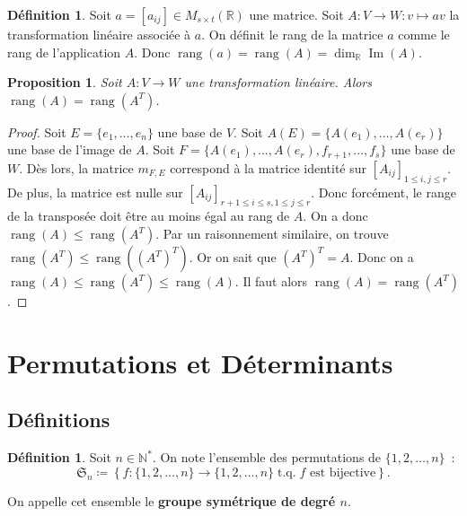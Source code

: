 \documentclass{article}
\DeclareMathOperator{\tq}{\text{ t.q. }}
\DeclareMathOperator{\Imf}{Im}
\DeclareMathOperator{\rang}{rang}
\newcommand{\R}{\mathbb R}
\newcommand{\M}[3]{M_{#1 \times #2}(#3)}
\newtheorem{prp}[thm]{Proposition}
\theoremstyle{definition}
\newtheorem{déf}[thm]{Définition}
\theoremstyle{remark}
\begin{document}
		\begin{déf} Soit $a = [a_{ij}] \in \M st\R$ une matrice. Soit $A : V \to W : v \mapsto av$ la transformation linéaire associée à $a$. On définit le rang de
		la matrice $a$ comme le rang de l'application $A$. Donc $\rang(a) = \rang(A) = \dim_\R\Imf(A)$. \end{déf}

		\begin{prp} Soit $A : V \to W$ une transformation linéaire. Alors $\rang(A) = \rang(A^T)$. \end{prp}

		\begin{proof} Soit $E = \{e_1, \dotsc, e_n\}$ une base de $V$. Soit $A(E) = \{A(e_1), \dotsc, A(e_r)\}$ une base de l'image de $A$. Soit
		$F = \{A(e_1), \dotsc, A(e_r), f_{r+1}, \dotsc, f_s\}$ une base de $W$. Dès lors, la matrice $m_{F, E}$ correspond à la matrice identité sur
		$[A_{ij}]_{1 \leq i, j \leq r}$. De plus, la matrice est nulle sur $[A_{ij}]_{r+1 \leq i \leq s, 1 \leq j \leq r}$. Donc forcément, le range de la transposée
		doit être au moins égal au rang de $A$. On a donc $\rang(A) \leq \rang(A^T)$. Par un raisonnement similaire, on trouve
		$\rang(A^T) \leq \rang\left(\left(A^T\right)^T\right)$. Or on sait que $\left(A^T\right)^T = A$. Donc on a $\rang(A) \leq \rang(A^T) \leq \rang(A)$. Il faut
		alors $\rang(A) = \rang(A^T)$. \end{proof}

\newpage
\section{Permutations et Déterminants}
	\subsection{Définitions}
		\begin{déf} Soit $n \in \mathbb N^*$. On note l'ensemble des permutations de $\{1, 2, \dotsc, n\}$~:
		\[\mathfrak{S}_n \coloneqq \left\{f : \{1, 2, \dotsc, n\} \to \{1, 2, \dotsc, n\} \tq f \text{ est bijective}\right\}.\]

		On appelle cet ensemble le \textbf{groupe symétrique de degré $n$}. \end{déf}
\end{document}
